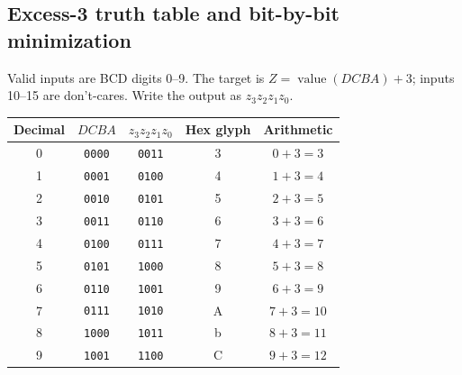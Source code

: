 \documentclass[a4paper,11pt]{article}
\begin{document}
\subsection{Excess-3 truth table and bit-by-bit minimization}
Valid inputs are BCD digits 0--9. The target is $Z=\operatorname{value}(DCBA)+3$;
inputs 10--15 are don't-cares. Write the output as $z_3z_2z_1z_0$.


\begin{center}\small
\begin{tabular}{ccccc}
\toprule
Decimal & $DCBA$ & $z_3z_2z_1z_0$ & Hex glyph & Arithmetic\\\midrule
0 & \texttt{0000} & \texttt{0011} & 3 & $0+3=3$\\
1 & \texttt{0001} & \texttt{0100} & 4 & $1+3=4$\\
2 & \texttt{0010} & \texttt{0101} & 5 & $2+3=5$\\
3 & \texttt{0011} & \texttt{0110} & 6 & $3+3=6$\\
4 & \texttt{0100} & \texttt{0111} & 7 & $4+3=7$\\
5 & \texttt{0101} & \texttt{1000} & 8 & $5+3=8$\\
6 & \texttt{0110} & \texttt{1001} & 9 & $6+3=9$\\
7 & \texttt{0111} & \texttt{1010} & A & $7+3=10$\\
8 & \texttt{1000} & \texttt{1011} & b & $8+3=11$\\
9 & \texttt{1001} & \texttt{1100} & C & $9+3=12$\\
\bottomrule\end{tabular}\end{center}


\clearpage
\end{document}
